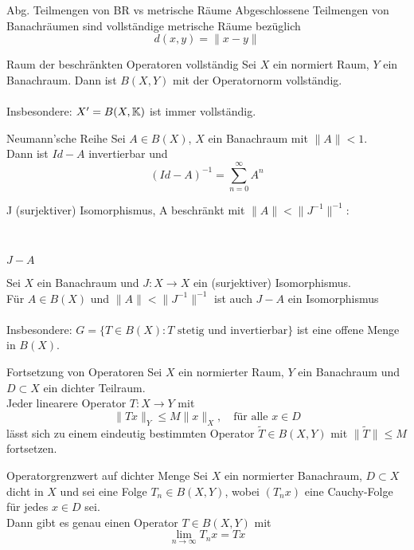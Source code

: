 	\begin{karte}{Abg. Teilmengen von BR vs metrische Räume}	
		Abgeschlossene Teilmengen von Banachräumen sind vollständige metrische Räume bezüglich \[ d(x, y) = \| x - y\| \]
	\end{karte}

	\begin{karte}{Raum der beschränkten Operatoren vollständig}		
		Sei $X$ ein normiert Raum, $Y$ ein Banachraum.
	Dann ist $B(X, Y)$ mit der Operatornorm vollständig. \\ \\
	Insbesondere: $X' = B(X, \mathbb{K})$ ist immer  vollständig.
	\end{karte}
	
	\begin{karte}{Neumann'sche Reihe}
		Sei $A \in B(X)$, $X$ ein Banachraum mit $\| A \| < 1$. \\
		Dann ist $Id - A$ invertierbar und 
		\[ \left( Id - A \right)^{-1} = \sum_{n = 0}^{\infty} A^{n} \]
	\end{karte}

	\begin{karte}{J (surjektiver) Isomorphismus, A beschränkt mit $\| A \| < \| J^{-1} \|^{-1}$:
	
		~
		
		 $J - A$}	
		Sei $X$ ein Banachraum und $J: X \rightarrow X$ ein (surjektiver) Isomorphismus. \\
		Für $A \in B(X)$ und $\| A \| < \| J^{-1} \|^{-1}$ ist auch $J - A$ ein Isomorphismus \\ \\
		Insbesondere: $G = \{ T \in B(X): T \text{ stetig und invertierbar} \}$ ist eine offene Menge in $B(X)$.
	\end{karte}	
	
	\begin{karte}{Fortsetzung von Operatoren}
		Sei $X$ ein normierter Raum, $Y$ ein Banachraum und $D \subset X$ ein dichter Teilraum. \\
		Jeder linearere Operator $T: X \rightarrow Y$ mit
		\[ \| T x \|_{Y} \leq M \| x \|_{X}, \quad \text{für alle } x \in D \]
		lässt sich zu einem eindeutig bestimmten Operator $ \tilde T \in B(X, Y)$ mit $\| \tilde T \| \leq M	$ fortsetzen.
	\end{karte}
	
	\begin{karte}{Operatorgrenzwert auf dichter Menge}
		Sei $X$ ein normierter Banachraum, $D \subset X$ dicht in $X$ und sei eine Folge $T_{n} \in B(X, Y)$, wobei $(T_{n} x)$ eine Cauchy-Folge für jedes $x \in D$ sei. \\
		Dann gibt es genau einen Operator $T \in B(X, Y)$ mit
		\[ \lim_{n \rightarrow \infty} T_{n} x = T x \]
	\end{karte}

